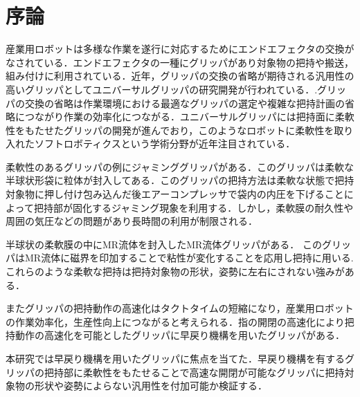 \section{序論}
\label{sec:序論}
産業用ロボットは多様な作業を遂行に対応するためにエンドエフェクタの交換がなされている．エンドエフェクタの一種にグリッパがあり対象物の把持や搬送，組み付けに利用されている．近年，グリッパの交換の省略が期待される汎用性の高いグリッパとしてユニバーサルグリッパの研究開発が行われている．\cite{end}.グリッパの交換の省略は作業環境における最適なグリッパの選定や複雑な把持計画の省略につながり作業の効率化につながる．ユニバーサルグリッパには把持面に柔軟性をもたせたグリッパの開発が進んでおり，このようなロボットに柔軟性を取り入れたソフトロボティクス\cite{soft}という学術分野が近年注目されている．\par
柔軟性のあるグリッパの例にジャミンググリッパ\cite{jam}がある．このグリッパは柔軟な半球状形袋に粒体が封入してある．このグリッパの把持方法は柔軟な状態で把持対象物に押し付け包み込んだ後エアーコンプレッサで袋内の内圧を下げることによって把持部が固化するジャミング現象を利用する．しかし，柔軟膜の耐久性や周囲の気圧などの問題があり長時間の利用が制限される．\par
半球状の柔軟膜の中にMR流体を封入したMR流体グリッパ\cite{MR}がある．
このグリッパはMR流体に磁界を印加することで粘性が変化することを応用し把持に用いる.これらのような柔軟な把持は把持対象物の形状，姿勢に左右にされない強みがある．\par
またグリッパの把持動作の高速化はタクトタイムの短縮になり，産業用ロボットの作業効率化，生産性向上につながると考えられる．指の開閉の高速化により把持動作の高速化を可能としたグリッパに早戻り機構を用いたグリッパがある\cite{sh_hand}．\par
本研究では早戻り機構を用いたグリッパに焦点を当てた．早戻り機構を有するグリッパの把持部に柔軟性をもたせることで高速な開閉が可能なグリッパに把持対象物の形状や姿勢によらない汎用性を付加可能か検証する．

